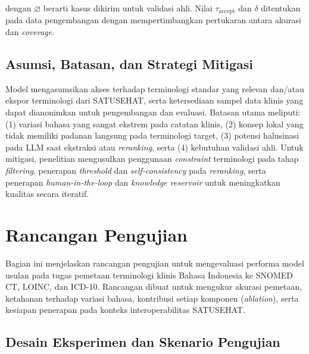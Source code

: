 dengan $\varnothing$ berarti kasus dikirim untuk validasi ahli. Nilai $\tau_{\mathrm{accept}}$ dan $\delta$ ditentukan pada data pengembangan dengan mempertimbangkan pertukaran antara akurasi dan \textit{coverage}.


\subsection{Asumsi, Batasan, dan Strategi Mitigasi}

Model mengasumsikan akses terhadap terminologi standar yang relevan dan/atau ekspor terminologi dari SATUSEHAT, serta ketersediaan sampel data klinis yang dapat dianonimkan untuk pengembangan dan evaluasi. Batasan utama meliputi: (1) variasi bahasa yang sangat ekstrem pada catatan klinis, (2) konsep lokal yang tidak memiliki padanan langsung pada terminologi target, (3) potensi halusinasi pada LLM saat ekstraksi atau \textit{reranking}, serta (4) kebutuhan validasi ahli. Untuk mitigasi, penelitian mengusulkan penggunaan \textit{constraint} terminologi pada tahap \textit{filtering}, penerapan \textit{threshold} dan \textit{self-consistency} pada \textit{reranking}, serta penerapan \textit{human-in-the-loop} dan \textit{knowledge reservoir} untuk meningkatkan kualitas secara iteratif.

\section{Rancangan Pengujian}

Bagian ini menjelaskan rancangan pengujian untuk mengevaluasi performa model usulan pada tugas pemetaan terminologi klinis Bahasa Indonesia ke SNOMED CT, LOINC, dan ICD-10. Rancangan dibuat untuk mengukur akurasi pemetaan, ketahanan terhadap variasi bahasa, kontribusi setiap komponen (\textit{ablation}), serta kesiapan penerapan pada konteks interoperabilitas SATUSEHAT.

\subsection{Desain Eksperimen dan Skenario Pengujian}

